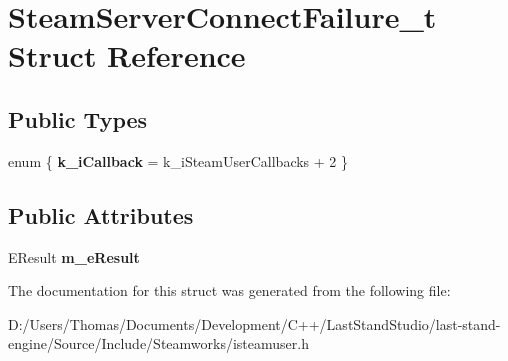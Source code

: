 \hypertarget{structSteamServerConnectFailure__t}{}\section{Steam\+Server\+Connect\+Failure\+\_\+t Struct Reference}
\label{structSteamServerConnectFailure__t}
\subsection*{Public Types}
\begin{DoxyCompactItemize}
\item 
\hypertarget{structSteamServerConnectFailure__t_a604bc306572d0e9d6be904590f6b56f3}{}enum \{ {\bfseries k\+\_\+i\+Callback} = k\+\_\+i\+Steam\+User\+Callbacks + 2
 \}\label{structSteamServerConnectFailure__t_a604bc306572d0e9d6be904590f6b56f3}

\end{DoxyCompactItemize}
\subsection*{Public Attributes}
\begin{DoxyCompactItemize}
\item 
\hypertarget{structSteamServerConnectFailure__t_ace559dfc315833e05e738424f526c215}{}E\+Result {\bfseries m\+\_\+e\+Result}\label{structSteamServerConnectFailure__t_ace559dfc315833e05e738424f526c215}

\end{DoxyCompactItemize}


The documentation for this struct was generated from the following file\+:\begin{DoxyCompactItemize}
\item 
D\+:/\+Users/\+Thomas/\+Documents/\+Development/\+C++/\+Last\+Stand\+Studio/last-\/stand-\/engine/\+Source/\+Include/\+Steamworks/isteamuser.\+h\end{DoxyCompactItemize}
